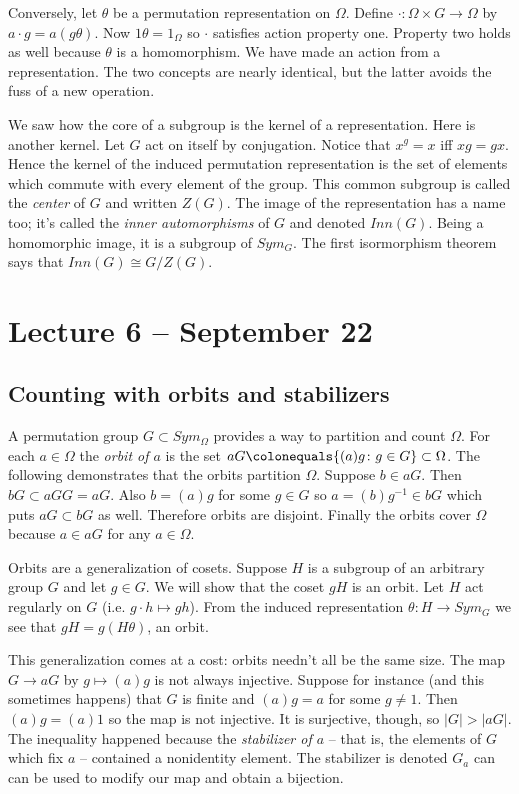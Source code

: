 \documentclass[letterpaper]{article}
\begin{document}
Conversely, let $\theta$ be a permutation representation on $\Omega$. Define $\cdot \colon \Omega \times G \rightarrow \Omega$ by $a \cdot g = a(g\theta)$. Now $1\theta = 1_\Omega$ so $\cdot$ satisfies action property one. Property two holds as well because $\theta$ is a homomorphism. We have made an action from a representation. The two concepts are nearly identical, but the latter avoids the fuss of a new operation.

We saw how the core of a subgroup is the kernel of a representation. Here is another kernel. Let $G$ act on itself by conjugation. Notice that $x^g = x$ iff $xg = gx$. Hence the kernel of the induced permutation representation is the set of elements which commute with every element of the group. This common subgroup is called the \emph{center} of $G$ and written $Z(G)$. The image of the representation has a name too; it's called the \emph{inner automorphisms} of $G$ and denoted $Inn(G)$. Being a homomorphic image, it is a subgroup of $Sym_G$. The first isormorphism theorem says that $Inn(G) \cong G/Z(G)$.

\section{Lecture 6 -- September 22}

\subsection{Counting with orbits and stabilizers}

A permutation group $G \subset Sym_\Omega$ provides a way to partition and count  $\Omega$. For each $a \in \Omega$ the \emph{orbit of $a$} is the set $aG \colonequals \{(a)g\colon g \in G\} \subset \Omega$. The following demonstrates that the orbits partition $\Omega$. Suppose $b \in aG$. Then $bG \subset aGG = aG$. Also $b = (a)g$ for some $g \in G$ so $a = (b)g^{-1} \in bG$ which puts $aG \subset bG$ as well. Therefore orbits are disjoint. Finally the orbits cover $\Omega$ because $a \in aG$ for any $a \in \Omega$.

Orbits are a generalization of cosets. Suppose $H$ is a subgroup of an arbitrary group $G$ and let $g \in G$. We will show that the coset $gH$ is an orbit. Let $H$ act regularly on $G$ (i.e. $g\cdot h \mapsto gh$). From the induced representation $\theta \colon H \rightarrow Sym_G$ we see that $gH = g(H\theta)$, an orbit.

This generalization comes at a cost: orbits needn't all be the same size. The map $G \rightarrow aG$ by $g \mapsto (a)g$ is not always injective. Suppose for instance (and this sometimes happens) that $G$ is finite and $(a)g = a$ for some $g \ne 1$. Then $(a)g = (a)1$ so the map is not injective. It is surjective, though, so $|G| > |aG|$. The inequality happened because the \emph{stabilizer of $a$} -- that is, the elements of $G$ which fix $a$ -- contained a nonidentity element. The stabilizer is denoted $G_a$ can can be used to modify our map and obtain a bijection.
\end{document}
